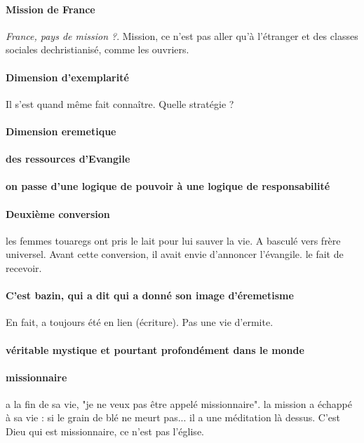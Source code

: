 \paragraph{Mission de France} \textit{France, pays de mission ?}. Mission, ce n'est pas aller qu'à l'étranger et des classes sociales dechristianisé, comme les ouvriers. 

\paragraph{Dimension d'exemplarité} Il s'est quand même fait connaître. Quelle stratégie ?

\paragraph{Dimension eremetique}

\paragraph{des ressources d'Evangile}

\paragraph{on passe d'une logique de pouvoir à une logique de responsabilité}

\paragraph{Deuxième conversion} les femmes touaregs ont pris le lait pour lui sauver la vie. A basculé vers frère universel. Avant cette conversion, il avait envie d'annoncer l'évangile. le fait de recevoir.

\paragraph{C'est bazin, qui a dit qui a donné son image d'éremetisme} En fait, a toujours été en lien (écriture). Pas une vie d'ermite. 

\paragraph{véritable mystique et pourtant profondément dans le monde}

\paragraph{missionnaire} a la fin de sa vie, "je ne veux pas être appelé missionnaire". la mission a échappé à sa vie : si le grain de blé ne meurt pas... il a une méditation là dessus.
C'est Dieu qui est missionnaire, ce n'est pas l'église.

